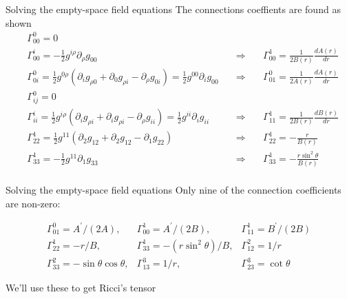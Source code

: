 \documentclass[xcolor=dvipsnames]{beamer}
\begin{document}
\begin{frame}{Solving the empty-space field equations}
The connections coeffients are found as shown
 \small
$$
\begin{aligned}
&\Gamma_{00}^{0}=0\\
&\Gamma_{00}^{i}=-\frac{1}{2} g^{i \rho} \partial_{\rho} g_{00} \quad & \Rightarrow & \quad \Gamma_{00}^{1}=\frac{1}{2 B(r)} \frac{d A(r)}{d r}\\
&\Gamma_{0 i}^{0}=\frac{1}{2} g^{0 \rho}\left(\partial_{i} g_{\rho 0}+\partial_{0} g_{\rho i}-\partial_{\rho} g_{0 i}\right)=\frac{1}{2} g^{00} \partial_{i} g_{00} \quad & \Rightarrow & \quad \Gamma_{01}^{0}=\frac{1}{2 A(r)} \frac{d A(r)}{d r}\\
&\Gamma_{i j}^{0}=0\\
&\Gamma_{i i}^{i}=\frac{1}{2} g^{i \rho}\left(\partial_{i} g_{\rho i}+\partial_{i} g_{\rho i}-\partial_{\rho} g_{i i}\right)=\frac{1}{2} g^{i i} \partial_{i} g_{i i} \quad & \Rightarrow & \quad \Gamma_{11}^{1}=\frac{1}{2 B(r)} \frac{d B(r)}{d r}\\
&\Gamma_{22}^{1}=\frac{1}{2} g^{11}\left(\partial_{2} g_{12}+\partial_{2} g_{12}-\partial_{1} g_{22}\right) \quad & \Rightarrow & \quad \Gamma_{22}^{1}=-\frac{r}{B(r)}\\
&\Gamma_{33}^{1}=-\frac{1}{2} g^{11} \partial_{1} g_{33} \quad & \Rightarrow & \quad \Gamma_{33}^{1}=-\frac{r \sin ^{2} \theta}{B(r)}\\
\end{aligned}
$$
\end{frame}

\begin{frame}{Solving the empty-space field equations}
Only nine of the connection coefficients are non-zero:
\begin{block}
{}  
$$
\begin{array}{lll}
\Gamma_{01}^{0}=A^{\prime} /(2 A), & \Gamma_{00}^{1}=A^{\prime} /(2 B), & \Gamma_{11}^{1}=B^{\prime} /(2 B) \\
\Gamma_{22}^{1}=-r / B, & \Gamma_{33}^{1}=-\left(r \sin ^{2} \theta\right) / B, & \Gamma_{12}^{2}=1 / r \\
\Gamma_{33}^{2}=-\sin \theta \cos \theta, & \Gamma_{13}^{3}=1 / r, & \Gamma_{23}^{3}=\cot \theta
\end{array}
$$
\end{block}
We'll use these to get Ricci's tensor  
\end{frame}
\end{document}
